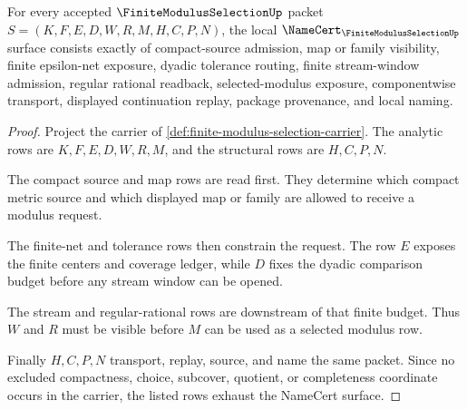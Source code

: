 \begin{theorem}
\label{thm:finite-modulus-selection-namecert-obligations}
For every accepted $\FiniteModulusSelectionUp$ packet $S=(K,F,E,D,W,R,M,H,C,P,N)$, the local $\NameCert_{\FiniteModulusSelectionUp}$ surface consists exactly of compact-source admission, map or family visibility, finite epsilon-net exposure, dyadic tolerance routing, finite stream-window admission, regular rational readback, selected-modulus exposure, componentwise transport, displayed continuation replay, package provenance, and local naming.
\end{theorem}
\begin{proof}
Project the carrier of \autoref{def:finite-modulus-selection-carrier}. The analytic rows are $K,F,E,D,W,R,M$, and the structural rows are $H,C,P,N$.

The compact source and map rows are read first. They determine which compact metric source and which displayed map or family are allowed to receive a modulus request.

The finite-net and tolerance rows then constrain the request. The row $E$ exposes the finite centers and coverage ledger, while $D$ fixes the dyadic comparison budget before any stream window can be opened.

The stream and regular-rational rows are downstream of that finite budget. Thus $W$ and $R$ must be visible before $M$ can be used as a selected modulus row.

Finally $H,C,P,N$ transport, replay, source, and name the same packet. Since no excluded compactness, choice, subcover, quotient, or completeness coordinate occurs in the carrier, the listed rows exhaust the NameCert surface.
\end{proof}

